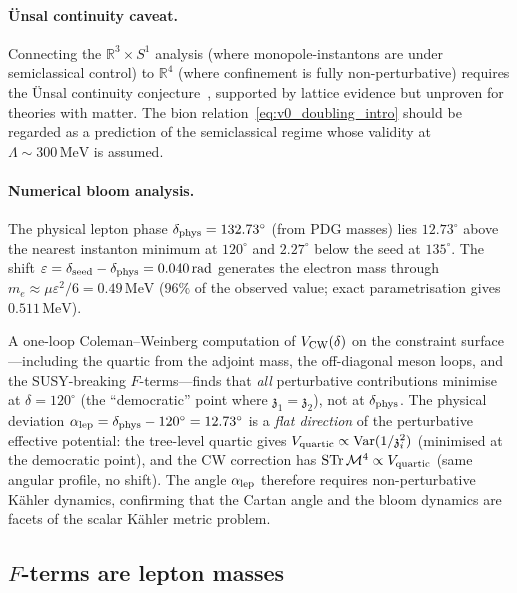 \documentclass[aps,prd,twocolumn,showpacs,preprintnumbers,superscriptaddress,floatfix]{revtex4-2}
\newcommand{\MeV}{\,\mathrm{MeV}}
\newcommand{\zch}{\mathfrak{z}}
\begin{document}
\paragraph{\"Unsal continuity caveat.}
Connecting the $\mathbb{R}^3 \times S^1$ analysis (where
monopole-instantons are under semiclassical control) to
$\mathbb{R}^4$ (where confinement is fully non-perturbative)
requires the \"Unsal continuity
conjecture~\cite{Unsal:2008}, supported by lattice evidence but
unproven for theories with matter.
The bion relation~\eqref{eq:v0_doubling_intro} should be regarded as
a prediction of the semiclassical regime whose validity at
$\Lambda \sim 300\MeV$ is assumed.

\paragraph{Numerical bloom analysis.}
The physical lepton phase $\delta_{\rm phys} = 132.73^\circ$
(from PDG masses) lies $12.73^\circ$ above the nearest instanton
minimum at $120^\circ$ and $2.27^\circ$ below the seed at
$135^\circ$.
The shift $\varepsilon = \delta_{\rm seed} - \delta_{\rm phys}
= 0.040\,\text{rad}$ generates the electron mass through
$m_e \approx \mu\varepsilon^2/6 = 0.49\MeV$ ($96\%$ of the
observed value; exact parametrisation gives $0.511\MeV$).

A one-loop Coleman--Weinberg computation of $V_{\rm CW}(\delta)$
on the constraint surface---including the quartic from the
adjoint mass, the off-diagonal meson loops, and the SUSY-breaking
$F$-terms---finds that \emph{all} perturbative contributions
minimise at $\delta = 120^\circ$ (the ``democratic'' point where
$\zch_1 = \zch_2$), not at $\delta_{\rm phys}$.
The physical deviation $\alpha_{\rm lep} = \delta_{\rm phys}
- 120^\circ = 12.73^\circ$ is a \emph{flat direction} of the
perturbative effective potential: the tree-level quartic gives
$V_{\rm quartic} \propto \mathrm{Var}(1/\zch_i^2)$ (minimised
at the democratic point), and the CW correction has
$\mathrm{STr}\,\mathcal{M}^4 \propto V_{\rm quartic}$ (same
angular profile, no shift).
The angle $\alpha_{\rm lep}$ therefore requires non-perturbative
K\"ahler dynamics, confirming that the Cartan angle and the bloom dynamics
are facets of the scalar K\"ahler metric problem.


\subsection{$F$-terms are lepton masses}
\end{document}
